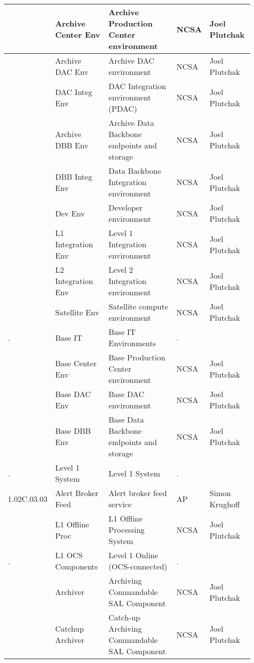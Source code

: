 \begin{longtable}{|p{}|p{}|p{}|p{}|p{}|}
{\tiny } & \small Archive Center Env & Archive Production Center environment & NCSA & Joel Plutchak\\ \hline 
{\tiny } & \small Archive DAC Env & Archive DAC environment & NCSA & Joel Plutchak\\ \hline 
{\tiny } & \small DAC Integ Env & DAC Integration environment (PDAC) & NCSA & Joel Plutchak\\ \hline 
{\tiny } & \small Archive DBB Env & Archive Data Backbone endpoints and storage & NCSA & Joel Plutchak\\ \hline 
{\tiny } & \small DBB Integ Env & Data Backbone Integration environment & NCSA & Joel Plutchak\\ \hline 
{\tiny } & \small Dev Env & Developer environment & NCSA & Joel Plutchak\\ \hline 
{\tiny } & \small L1 Integration Env & Level 1 Integration environment & NCSA & Joel Plutchak\\ \hline 
{\tiny } & \small L2 Integration Env & Level 2 Integration environment & NCSA & Joel Plutchak\\ \hline 
{\tiny } & \small Satellite Env & Satellite compute environment & NCSA & Joel Plutchak\\ \hline 
{\tiny .} & \small Base IT & Base IT Environments & . & \\ \hline 
{\tiny } & \small Base Center Env & Base Production Center environment & NCSA & Joel Plutchak\\ \hline 
{\tiny } & \small Base DAC Env & Base DAC environment & NCSA & Joel Plutchak\\ \hline 
{\tiny } & \small Base DBB Env & Base Data Backbone endpoints and storage & NCSA & Joel Plutchak\\ \hline 
{\tiny .} & \small Level 1 System & Level 1 System & . & \\ \hline 
{\tiny 1.02C.03.03} & \small Alert Broker Feed & Alert broker feed service & AP & Simon Krughoff\\ \hline 
{\tiny } & \small L1 Offline Proc & L1 Offline Processing System & NCSA & Joel Plutchak\\ \hline 
{\tiny .} & \small L1 OCS Components & Level 1 Online (OCS-connected) & . & \\ \hline 
{\tiny } & \small Archiver & Archiving Commandable SAL Component & NCSA & Joel Plutchak\\ \hline 
{\tiny } & \small Catchup Archiver & Catch-up Archiving Commandable SAL Component & NCSA & Joel Plutchak\\ \hline 

\end{longtable}
